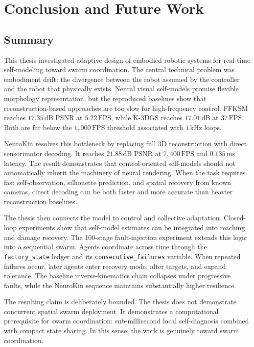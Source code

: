 \documentclass[12pt,a4paper,oneside]{report}
\begin{document}
\chapter{Conclusion and Future Work}

\section{Summary}

This thesis investigated adaptive design of embodied robotic systems for real-time self-modeling toward swarm coordination. The central technical problem was embodiment drift: the divergence between the robot assumed by the controller and the robot that physically exists. Neural visual self-models promise flexible morphology representation, but the reproduced baselines show that reconstruction-based approaches are too slow for high-frequency control. FFKSM reaches $17.35\,\mathrm{dB}$ PSNR at $5.22\,\mathrm{FPS}$, while K-3DGS reaches $17.01\,\mathrm{dB}$ at $37\,\mathrm{FPS}$. Both are far below the $1{,}000\,\mathrm{FPS}$ threshold associated with $1\,\mathrm{kHz}$ loops.

NeuroKin resolves this bottleneck by replacing full 3D reconstruction with direct sensorimotor decoding. It reaches $21.88\,\mathrm{dB}$ PSNR at $7{,}400\,\mathrm{FPS}$ and $0.135\,\mathrm{ms}$ latency. The result demonstrates that control-oriented self-models should not automatically inherit the machinery of neural rendering. When the task requires fast self-observation, silhouette prediction, and spatial recovery from known cameras, direct decoding can be both faster and more accurate than heavier reconstruction baselines.

The thesis then connects the model to control and collective adaptation. Closed-loop experiments show that self-model estimates can be integrated into reaching and damage recovery. The 100-stage fault-injection experiment extends this logic into a sequential swarm. Agents coordinate across time through the \texttt{factory\_state} ledger and its \texttt{consecutive\_failures} variable. When repeated failures occur, later agents enter recovery mode, alter targets, and expand tolerance. The baseline inverse-kinematics chain collapses under progressive faults, while the NeuroKin sequence maintains substantially higher resilience.

The resulting claim is deliberately bounded. The thesis does not demonstrate concurrent spatial swarm deployment. It demonstrates a computational prerequisite for swarm coordination: sub-millisecond local self-diagnosis combined with compact state sharing. In this sense, the work is genuinely toward swarm coordination.
\end{document}
